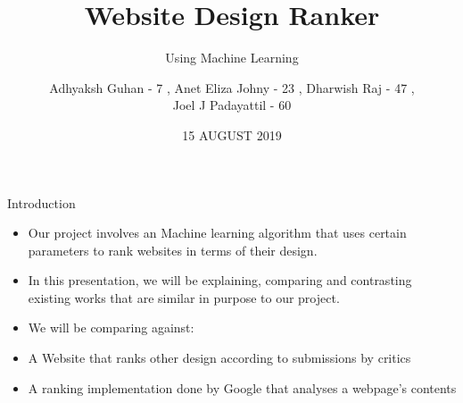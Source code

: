 \documentclass[11pt]{beamer}
\begin{document}
	\title{\textbf{Website Design Ranker}}
	\subtitle{Using Machine Learning}
	\date{15 AUGUST 2019}
	\author{{\scriptsize Adhyaksh Guhan - 7 , Anet Eliza Johny - 23 , Dharwish Raj - 47 , \\ Joel J Padayattil - 60}}
	\begin{frame}[plain]
		\maketitle
	\end{frame}
	\begin{frame}{Introduction}
		\begin{itemize}
			\item Our project involves an Machine learning algorithm that uses certain parameters to rank websites in terms of their design.
			
			\item In this presentation, we will be explaining, comparing and contrasting existing works that are similar in purpose to our project.
		
			\item We will be comparing against:
				\item A Website that ranks other design according to submissions by critics
				\item A ranking implementation done by Google that analyses a webpage's contents
		\end{itemize}
	\end{frame}
\end{document}
